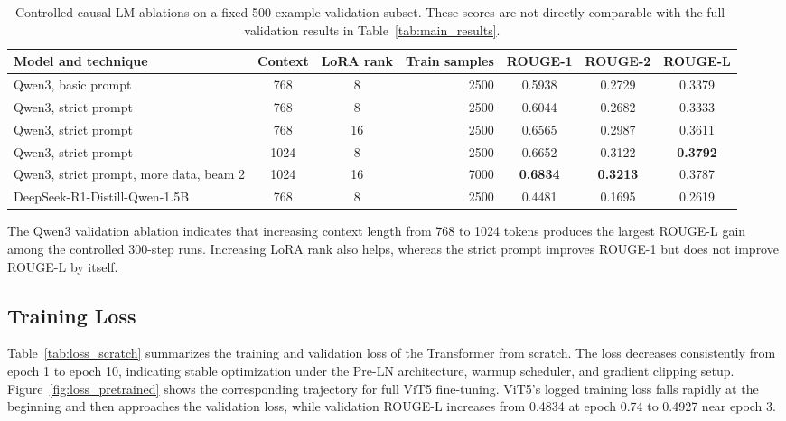 \documentclass[conference]{IEEEtran}
\begin{document}
\begin{table}[htbp]
\centering
\caption{Controlled causal-LM ablations on a fixed 500-example validation subset. These scores are not directly comparable with the full-validation results in Table~\ref{tab:main_results}.}
\label{tab:qwen_ablation}
\begin{tabular}{lccrccc}
\toprule
Model and technique & Context & LoRA rank & Train samples & ROUGE-1 & ROUGE-2 & ROUGE-L \\
\midrule
Qwen3, basic prompt & 768 & 8 & 2500 & 0.5938 & 0.2729 & 0.3379 \\
Qwen3, strict prompt & 768 & 8 & 2500 & 0.6044 & 0.2682 & 0.3333 \\
Qwen3, strict prompt & 768 & 16 & 2500 & 0.6565 & 0.2987 & 0.3611 \\
Qwen3, strict prompt & 1024 & 8 & 2500 & 0.6652 & 0.3122 & \textbf{0.3792} \\
Qwen3, strict prompt, more data, beam 2 & 1024 & 16 & 7000 & \textbf{0.6834} & \textbf{0.3213} & 0.3787 \\
DeepSeek-R1-Distill-Qwen-1.5B & 768 & 8 & 2500 & 0.4481 & 0.1695 & 0.2619 \\
\bottomrule
\end{tabular}
\end{table}

The Qwen3 validation ablation indicates that increasing context length from 768 to 1024 tokens produces the largest ROUGE-L gain among the controlled 300-step runs. Increasing LoRA rank also helps, whereas the strict prompt improves ROUGE-1 but does not improve ROUGE-L by itself.

\subsection{Training Loss}
Table~\ref{tab:loss_scratch} summarizes the training and validation loss of the Transformer from scratch. The loss decreases consistently from epoch 1 to epoch 10, indicating stable optimization under the Pre-LN architecture, warmup scheduler, and gradient clipping setup. Figure~\ref{fig:loss_pretrained} shows the corresponding trajectory for full ViT5 fine-tuning. ViT5's logged training loss falls rapidly at the beginning and then approaches the validation loss, while validation ROUGE-L increases from 0.4834 at epoch 0.74 to 0.4927 near epoch 3.
\end{document}
